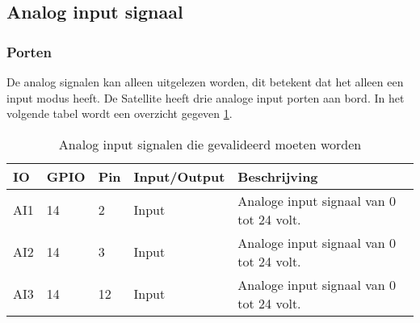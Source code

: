 \newpage
\subsection{Analog input signaal} \label{Analog Input Signaal}
\subsubsection{Porten}
De analog signalen kan alleen uitgelezen worden, dit betekent dat het alleen een input modus heeft. De Satellite heeft drie analoge input porten aan bord. In het volgende tabel wordt een overzicht gegeven \ref{tab:hw_val_ai}.
\begin{table}[h!]
	\caption{Analog input signalen die gevalideerd moeten worden}
	\begin{tabular}{llllp{9cm}}
	\toprule
	\textbf{IO} & \textbf{GPIO} & \textbf{Pin} & \textbf{Input/Output} & \textbf{Beschrijving}			\\ \toprule
	AI1			& 14		& 2    	& Input		& Analoge input signaal van 0 tot 24 volt.					\\
	AI2			& 14		& 3    	& Input		& Analoge input signaal van 0 tot 24 volt.					\\
	AI3			& 14		& 12   	& Input		& Analoge input signaal van 0 tot 24 volt.					\\  \bottomrule
	\end{tabular}
	\label{tab:hw_val_ai}
\end{table}
